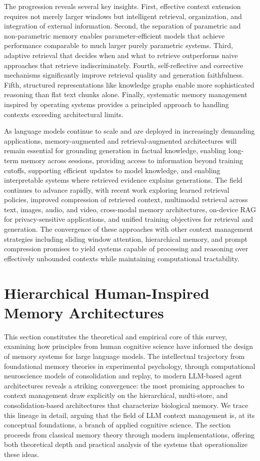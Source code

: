 \documentclass[11pt,letterpaper]{article}
\begin{document}
The progression reveals several key insights. First, effective context extension requires not merely larger windows but intelligent retrieval, organization, and integration of external information. Second, the separation of parametric and non-parametric memory enables parameter-efficient models that achieve performance comparable to much larger purely parametric systems. Third, adaptive retrieval that decides when and what to retrieve outperforms naive approaches that retrieve indiscriminately. Fourth, self-reflective and corrective mechanisms significantly improve retrieval quality and generation faithfulness. Fifth, structured representations like knowledge graphs enable more sophisticated reasoning than flat text chunks alone. Finally, systematic memory management inspired by operating systems provides a principled approach to handling contexts exceeding architectural limits.

As language models continue to scale and are deployed in increasingly demanding applications, memory-augmented and retrieval-augmented architectures will remain essential for grounding generation in factual knowledge, enabling long-term memory across sessions, providing access to information beyond training cutoffs, supporting efficient updates to model knowledge, and enabling interpretable systems where retrieved evidence explains generations. The field continues to advance rapidly, with recent work exploring learned retrieval policies, improved compression of retrieved context, multimodal retrieval across text, images, audio, and video, cross-modal memory architectures, on-device RAG for privacy-sensitive applications, and unified training objectives for retrieval and generation. The convergence of these approaches with other context management strategies including sliding window attention, hierarchical memory, and prompt compression promises to yield systems capable of processing and reasoning over effectively unbounded contexts while maintaining computational tractability.


\section{Hierarchical Human-Inspired Memory Architectures}
\label{sec:hierarchical}

This section constitutes the theoretical and empirical core of this survey, examining how principles from human cognitive science have informed the design of memory systems for large language models. The intellectual trajectory from foundational memory theories in experimental psychology, through computational neuroscience models of consolidation and replay, to modern LLM-based agent architectures reveals a striking convergence: the most promising approaches to context management draw explicitly on the hierarchical, multi-store, and consolidation-based architectures that characterize biological memory. We trace this lineage in detail, arguing that the field of LLM context management is, at its conceptual foundations, a branch of applied cognitive science. The section proceeds from classical memory theory through modern implementations, offering both theoretical depth and practical analysis of the systems that operationalize these ideas.
\end{document}

